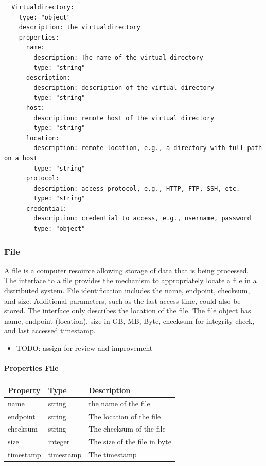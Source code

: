 \documentclass[9pt,]{article}
\providecommand{\tightlist}{%
  \setlength{\itemsep}{0pt}\setlength{\parskip}{0pt}}
\let\oldparagraph\paragraph
\renewcommand{\paragraph}[1]{\oldparagraph{#1}\mbox{}}
\begin{document}
\begin{verbatim}
  Virtualdirectory:
    type: "object"
    description: the virtualdirectory
    properties:
      name:
        description: The name of the virtual directory
        type: "string"
      description:
        description: description of the virtual directory
        type: "string"
      host:
        description: remote host of the virtual directory
        type: "string"
      location:
        description: remote location, e.g., a directory with full path on a host
        type: "string"
      protocol:
        description: access protocol, e.g., HTTP, FTP, SSH, etc.
        type: "string"
      credential:
        description: credential to access, e.g., username, password
        type: "object"
\end{verbatim}

\hypertarget{file}{%
\subsubsection{File}\label{file}}

A file is a computer resource allowing storage of data that is being
processed. The interface to a file provides the mechanism to
appropriately locate a file in a distributed system. File identification
includes the name, endpoint, checksum, and size. Additional parameters,
such as the last access time, could also be stored. The interface only
describes the location of the file. The file object has name, endpoint
(location), size in GB, MB, Byte, checksum for integrity check, and last
accessed timestamp.

\begin{itemize}
\tightlist
\item
  TODO: assign for review and improvement
\end{itemize}

\hypertarget{properties-file}{%
\paragraph{Properties File}\label{properties-file}}

\begin{longtable}[]{@{}lll@{}}
\toprule
Property & Type & Description\tabularnewline
\midrule
\endhead
name & string & the name of the file\tabularnewline
endpoint & string & The location of the file\tabularnewline
checksum & string & The checksum of the file\tabularnewline
size & integer & The size of the file in byte\tabularnewline
timestamp & timestamp & The timestamp\tabularnewline
\bottomrule
\end{longtable}
\end{document}
